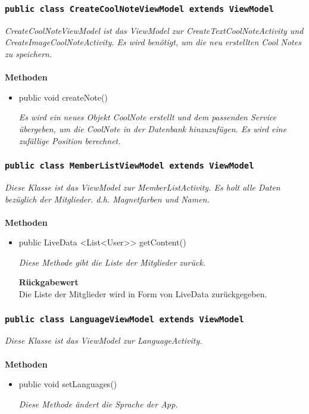            		\subsubsection{\texttt{public class CreateCoolNoteViewModel extends ViewModel}}
        \textit{CreateCoolNoteViewModel ist das ViewModel zur CreateTextCoolNoteActivity und CreateImageCoolNoteActivity. Es wird benötigt, um die neu erstellten Cool Notes zu speichern.}\\
        \\
		\textbf{Methoden} \\
 			\begin{itemize}
        		\item{public void createNote()}
        	
        		\textit{Es wird ein neues Objekt CoolNote erstellt und dem passenden Service übergeben, um die CoolNote in der Datenbank hinzuzufügen. Es wird eine zufällige Position berechnet.}
        	
       		 \end{itemize}
       		 
           		\subsubsection{\texttt{public class MemberListViewModel extends ViewModel}}
        \textit{Diese Klasse ist das ViewModel zur MemberListActivity. Es holt alle Daten bezüglich der Mitglieder. d.h. Magnetfarben und Namen.}\\
        \\
		\textbf{Methoden} \\
 			\begin{itemize}
        		\item{public LiveData <List<User>> getContent()}
        	
        		\textit{Diese Methode gibt die Liste der Mitglieder zurück.}
        	
        	\textbf{Rückgabewert} \\
				Die Liste der Mitglieder wird in Form von LiveData zurückgegeben.
				
       		 \end{itemize}
       		 
       		   \subsubsection{\texttt{public class LanguageViewModel extends ViewModel}}
        \textit{Diese Klasse ist das ViewModel zur LanguageActivity.}\\
        \\
		\textbf{Methoden} \\
 			\begin{itemize}
        		\item{public void setLanguages()}
        	
        		\textit{Diese Methode ändert die Sprache der App.}
        	
       		 \end{itemize}
       		 
